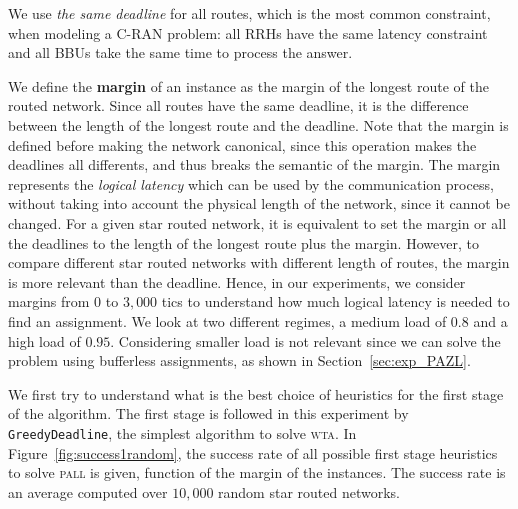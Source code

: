\documentclass[a4paper,10pt]{journal}
\newcommand\greedydeadline{\texttt{GreedyDeadline}\xspace}
\newcommand\pall{\textsc{pall}\xspace}
\newcommand\wta{\textsc{wta}\xspace}
\begin{document}
    We use \emph{the same deadline} for all routes, which is the most common constraint, when modeling a C-RAN problem: all RRHs have the same latency constraint and all BBUs take the same time to process the answer. 


    We define the {\bf margin} of an instance as the margin of the longest route of the routed network. Since all routes have the same deadline, it is the difference between the length of the longest route and the deadline. Note that the margin is defined before making the network canonical, since this operation makes the deadlines all differents, and thus breaks the semantic of the margin.
	The margin represents the \emph{logical latency} which can be used by the communication process, without taking into account the physical length of the network, since it cannot be changed. For a given star routed network, it is equivalent to set the margin or all the deadlines to the length of the longest route plus the margin. However, to compare different star routed networks with different length of routes, the margin is more relevant than the deadline. Hence, in our experiments, we consider margins from $0$ to $3,000$ tics to understand how much logical latency is needed to find an assignment. We look at two different regimes, a medium load of $0.8$ and a high load of $0.95$. Considering smaller load is not relevant since we can solve the problem using bufferless assignments, as shown in Section~\ref{sec:exp_PAZL}. 
   
   	We first try to understand what is the best choice of heuristics for the first stage of the algorithm. The first stage is followed in this experiment by \greedydeadline, the simplest algorithm to solve \wta. In Figure~\ref{fig:success1random}, the success rate of all possible first stage heuristics to solve \pall is given, function of the margin of the instances. The success rate is an average computed over $10,000$ random star routed networks. 
   
\end{document}
